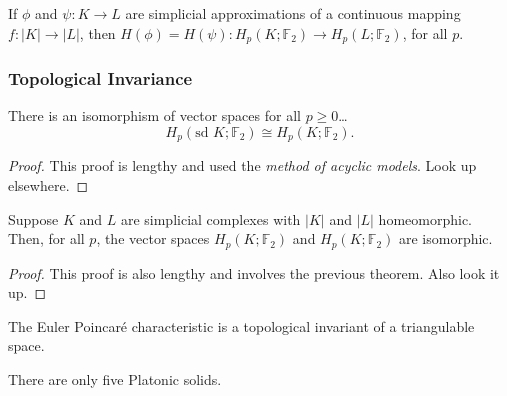 \begin{corollary}
If $\phi$ and $\psi : K \rightarrow L$ are simplicial approximations of a continuous mapping $f : |K| \rightarrow |L|$,
then $H(\phi) = H(\psi) : H_p(K; \mathbb{F}_2) \rightarrow H_p(L; \mathbb{F}_2)$, for all $p$.
\end{corollary}

\subsubsection{Topological Invariance}
\begin{theorem}
There is an isomorphism of vector spaces for all $p \geq 0$\dots
$$H_p(\textrm{sd }K; \mathbb{F}_2) \cong H_p(K; \mathbb{F}_2).$$
\end{theorem}

\begin{proof}
This proof is lengthy and used the \emph{method of acyclic models}. Look up elsewhere.
\end{proof}

\begin{theorem}
Suppose $K$ and $L$ are simplicial complexes with $|K|$ and $|L|$ homeomorphic. Then,
for all $p$, the vector spaces $H_p(K; \mathbb{F}_2)$ and $H_p(K; \mathbb{F}_2)$ are isomorphic.
\end{theorem}

\begin{proof}
This proof is also lengthy and involves the previous theorem. Also look it up.
\end{proof}

\begin{corollary}
The Euler Poincar\'e characteristic is a topological invariant of a triangulable space.
\end{corollary}

\begin{theorem}
There are only five Platonic solids.
\end{theorem}

